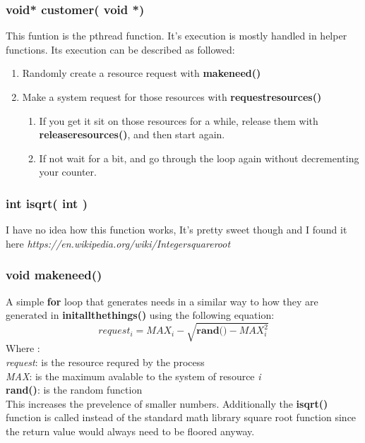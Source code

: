 \documentclass[11pt]{article}
\begin{document}
\subsubsection{ void* customer( void *)}
This funtion is the pthread function. It's execution is mostly handled in helper functions. Its execution can be described as followed:

\begin{enumerate}
\item Randomly create a resource request with \textbf{make\textunderscore need()}
\item Make a system request for those resources with \textbf{request\textunderscore resources()}

\begin{enumerate}
\item If you get it sit on those resources for a while, release them with \textbf{release\textunderscore resources()}, and then start again.
\item If not wait for a bit, and go through the loop again without decrementing your counter.
\end{enumerate}
\end{enumerate}

\subsubsection{ int isqrt( int )}
I have no idea how this function works, It's pretty sweet though and I found it here \textit{https://en.wikipedia.org/wiki/Integer\textunderscore square\textunderscore root}

\subsubsection{ void make\textunderscore need()}
A simple \textbf{for} loop that generates needs in a similar way to how they are generated in  \textbf{init\textunderscore all\textunderscore the\textunderscore things()} using the following equation:
$$request_{i} = MAX_i - \sqrt{ \textbf{rand()} - MAX_i^2} $$
Where : \\
\textit{request}: is the resource requred by the process\\
\textit{MAX}: is the maximum avalable to the system of resource \textit{i}\\
\textbf{rand()}: is the random function
\\
This increases the prevelence of smaller numbers. Additionally the \textbf{isqrt()} function is called instead of the standard math library square root function since the return value would always need to be floored anyway.
\end{document}
